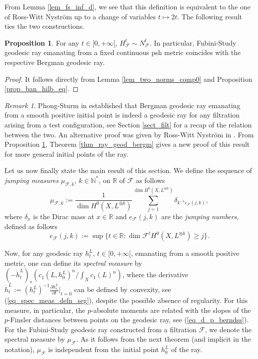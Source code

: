 \documentclass[12pt]{article}
\numberwithin{equation}{section}
\theoremstyle{theorem}
\theoremstyle{definition}
\newtheorem{prop}[thm]{Proposition}
\theoremstyle{remark}
\newtheorem{rem}[thm]{Remark}
\newcommand{\real}{\mathbb{R}}
\newcommand{\nat}{\mathbb{N}}
\begin{document}
	From Lemma \ref{lem_fs_inf_d}, we see that this definition is equivalent to the one of Ross-Witt Nystr{\"o}m \cite[Definition 9.1]{RossNystAnalTConf} up to a change of variables $t \mapsto 2 t$. 
	The following result ties the two constructions.
	\begin{prop}\label{prop_two_norms_comp}
		For any $t \in [0, +\infty[$, $H^t_{\mathcal{F}} \sim N^t_{\mathcal{F}}$.
		In particular, Fubini-Study geodesic ray emanating from a fixed continuous psh metric coincides with the respective Bergman geodesic ray.
	\end{prop}
	\begin{proof}
		It follows directly from Lemma \ref{lem_two_norms_comp0} and Proposition \ref{prop_ban_hilb_eq}.
	\end{proof}
	\begin{rem}
		Phong-Sturm in \cite[Theorem 1]{PhongSturmTestGeodK} established that Bergman geodesic ray emanating from a smooth positive initial point is indeed a geodesic ray for any filtration arising from a test configuration, see Section \ref{sect_filt} for a recap of the relation between the two.
		An alternative proof was given by Ross-Witt Nystr{\"o}m in \cite[\S 9]{RossNystAnalTConf}.
		From Proposition \ref{prop_two_norms_comp}, Theorem \ref{thm_ray_geod_bergm} gives a new proof of this result for more general initial points of the ray.
	\end{rem}
	\par 
	Let us now finally state the main result of this section.
	We define the sequence of \textit{jumping measures} $\mu_{\mathcal{F}, k}$, $k \in \nat^*$, on $\real$ of $\mathcal{F}$ as follows
	\begin{equation}\label{eq_jump_meas_d}
		\mu_{\mathcal{F}, k} := \frac{1}{\dim H^0(X, L^{\otimes k})} \sum_{j = 1}^{\dim H^0(X, L^{\otimes k})} \delta_{k^{-1} e_{\mathcal{F}}(j, k)}, 
	\end{equation}
	where $\delta_x$ is the Dirac mass at $x \in \real$ and $e_{\mathcal{F}}(j, k)$ are the \textit{jumping numbers}, defined as follows
	\begin{equation}\label{eq_defn_jump_numb}
		e_{\mathcal{F}}(j, k) := \sup \Big\{ t \in \real : \dim \mathcal{F}^t H^0(X, L^{\otimes k}) \geq j \Big\}.
	\end{equation}
	\par 
	\begin{sloppypar}
	Now, for any geodesic ray $h^L_t$, $t \in [0, +\infty[$, emanating from a smooth positive metric, one can define its \textit{spectral measure} by $(-\dot{h}^L_t)_* (c_1(L, h^L_0)^n / \int_X c_1(L)^n)$, where the derivative $\dot{h}^L_t := (h^L_t)^{-1} \frac{\partial h^L_t}{\partial t}|_{t = 0}$ can be defined by convexity, see (\ref{eq_spec_meas_defn_seg}), despite the possible absence of regularity.
	For this measure, in particular, the $p$-absolute moments are related with the slopes of the $p$-Finsler distances between points on the geodesic ray, see (\ref{eq_d_p_berndss}).
	For the Fubini-Study geodesic ray constructed from a filtration $\mathcal{F}$, we denote the spectral measure by $\mu_{\mathcal{F}}$.
	As it follows from the next theorem (and implicit in the notation), $\mu_{\mathcal{F}}$ is independent from the initial point $h^L_0$ of the ray.
	\end{sloppypar}
\end{document}
